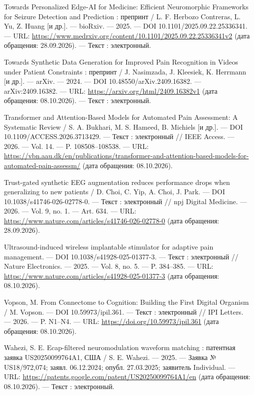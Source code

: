 \begin{list}{}{\setlength{\leftmargin}{10mm}\setlength{\labelwidth}{8mm}\setlength{\labelsep}{2mm}\setlength{\itemsep}{0pt}\setlength{\parsep}{0pt}\setlength{\topsep}{0pt}}
\item[286.] Towards Personalized Edge-AI for Medicine: Efficient Neuromorphic Frameworks for Seizure Detection and Prediction : препринт / L. F. Herbozo Contreras, L. Yu, Z. Huang [и др.]. — bioRxiv. — 2025. — DOI 10.1101/2025.09.22.25336341. — URL: \url{https://www.medrxiv.org/content/10.1101/2025.09.22.25336341v2} (дата обращения: 28.09.2026). — Текст : электронный.
\item[287.] Towards Synthetic Data Generation for Improved Pain Recognition in Videos under Patient Constraints : препринт / J. Nasimzada, J. Kleesiek, K. Herrmann [и др.]. — arXiv. — 2024. — DOI 10.48550/arXiv.2409.16382. — arXiv:2409.16382. — URL: \url{https://arxiv.org/html/2409.16382v1} (дата обращения: 08.10.2026). — Текст : электронный.
\item[288.] Transformer and Attention-Based Models for Automated Pain Assessment: A Systematic Review / S. A. Bukhari, M. S. Hameed, B. Michiels [и др.]. — DOI 10.1109/ACCESS.2026.3713429. — Текст : электронный // IEEE Access. — 2026. — Vol. 14. — P. 108508–108538. — URL: \url{https://vbn.aau.dk/en/publications/transformer-and-attention-based-models-for-automated-pain-assessm/} (дата обращения: 08.10.2026).
\item[289.] Trust-gated synthetic EEG augmentation reduces performance drops when generalizing to new patients / D. Choi, C. Yip, A. Choi, J. Park. — DOI 10.1038/s41746-026-02778-0. — Текст : электронный // npj Digital Medicine. — 2026. — Vol. 9, no. 1. — Art. 634. — URL: \url{https://www.nature.com/articles/s41746-026-02778-0} (дата обращения: 28.09.2026).
\item[290.] Ultrasound-induced wireless implantable stimulator for adaptive pain management. — DOI 10.1038/s41928-025-01377-3. — Текст : электронный // Nature Electronics. — 2025. — Vol. 8, no. 5. — P. 384–385. — URL: \url{https://www.nature.com/articles/s41928-025-01377-3} (дата обращения: 08.10.2026).
\item[291.] Vopson, M. From Connectome to Cognition: Building the First Digital Organism / M. Vopson. — DOI 10.59973/ipil.361. — Текст : электронный // IPI Letters. — 2026. — P. N1–N4. — URL: \url{https://doi.org/10.59973/ipil.361} (дата обращения: 08.10.2026).
\item[292.] Wahezi, S. E. Ecap-filtered neuromodulation waveform matching : патентная заявка US20250099764A1, США / S. E. Wahezi. — 2025. — Заявка № US18/972,074; заявл. 06.12.2024; опубл. 27.03.2025; заявитель Individual. — URL: \url{https://patents.google.com/patent/US20250099764A1/en} (дата обращения: 08.10.2026). — Текст : электронный.

\end{list}
